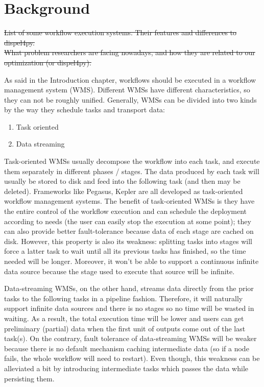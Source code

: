 \chapter{Background}
\sout{List of some workflow execution systems. Their features and differences to dispel4py. \\
What problem researchers are facing nowadays, and how they are related to our optimization (or dispel4py).}

As said in the Introduction chapter, workflows should be executed in a workflow management system (WMS). Different WMSs have different characteristics, so they can not be roughly unified.
 Generally, WMSs can be divided into two kinds by the way they schedule tasks and transport data:
\begin{enumerate}
	\item Task oriented
	\item Data streaming
\end{enumerate}

Task-oriented WMSs usually decompose the workflow into each task, and execute them separately in different phases / stages. The data produced by each task will usually be stored to disk and feed into the following task (and then may be deleted). Frameworks like Pegasus\cite{deelman2015pegasus}, Kepler\cite{ludascher2006scientific} are all developed as task-oriented workflow management systems. The benefit of task-oriented WMSs is they have the entire control of the workflow execution and can schedule the deployment according to needs (\ie the user can easily stop the execution at some point); they can also provide better fault-tolerance because data of each stage are cached on disk. However, this property is also its weakness: splitting tasks into stages will force a latter task to wait until all its previous tasks has finished, so the time needed will be longer. Moreover, it won't be able to support a continuous infinite data source because the stage used to execute that source will be infinite.

Data-streaming WMSs, on the other hand, streams data directly from the prior tasks to the following tasks in a pipeline fashion. Therefore, it will naturally support infinite data sources and there is no stages so no time will be wasted in waiting. As a result, the total execution time will be lower and users can get preliminary (partial) data when the first unit of outputs come out of the last task(s). On the contrary, fault tolerance of data-streaming WMSs will be weaker because there is no default mechanism caching intermediate data (so if a node fails, the whole workflow will need to restart). Even though, this weakness can be alleviated a bit by introducing intermediate tasks which passes the data while persisting them.

